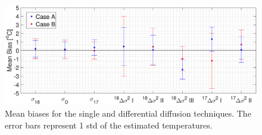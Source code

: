 \documentclass[11pt, draftcls, onecolumn]{IEEEtran} %
\numberwithin{equation}{section}
\numberwithin{table}{section}
\numberwithin{figure}{section}
\begin{document}
\begin{figure}[]
	\vspace*{2mm}
	\begin{center}
		\includegraphics[width=\textwidth]{Figure_10}
		\caption{Mean biases for the single and differential diffusion techniques.
			The error bars represent 1 std of the estimated temperatures.}  \label{fig:synthetic_data_bias}
	\end{center}
\end{figure}
\end{document}
